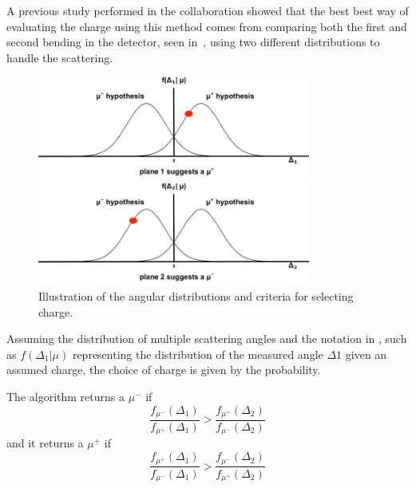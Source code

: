 A previous study performed in the collaboration showed that the best best way of evaluating the charge using this method comes from comparing both the first and second bending in the detector, seen in~, using two different distributions to handle the scattering.

\begin{figure}[h!]
\centering
\includegraphics[width=0.8\textwidth]{figures/equationFix2.jpg}

\includegraphics[width=0.8\textwidth]{figures/equationFix1.jpg}
\caption{Illustration of the angular distributions and criteria for selecting charge.}
\label{fig:NullHyp}
\end{figure}

Assuming the distribution of multiple scattering angles and the notation in , such as $f(\Delta_1 | \mu )$ representing the distribution of the measured angle $\Delta1$ given an assumed charge, the choice of charge is given by the probability.

The algorithm returns a $\mu^-$ if 
\begin{equation}
\frac{f_{\mu^-}(\Delta_1)}{f_{\mu^+}(\Delta_1)} > \frac{f_{\mu^+}(\Delta_2)}{f_{\mu^-}(\Delta_2)}
\end{equation}
and it returns a $\mu^+$ if
\begin{equation}
\frac{f_{\mu^+}(\Delta_1)}{f_{\mu^-}(\Delta_1)} > \frac{f_{\mu^-}(\Delta_2)}{f_{\mu^+}(\Delta_2)}
\end{equation}




